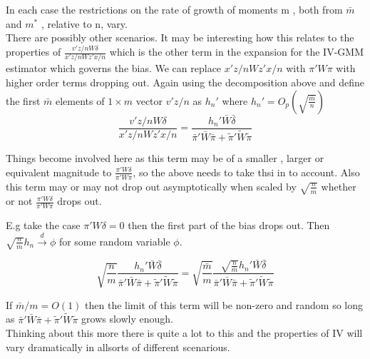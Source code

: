 \documentclass[11pt, fleqn]{article}
\begin{document}
In each case the restrictions on the rate of growth of moments m , both from $\bar{m}$ and $m^*$ , relative to n, vary.\\


There are possibly other  scenarios. It may be interesting how this relates to the properties of $\frac{v'z/nW\delta}{x'z/nWz'x/n}$ which is the other term in the expansion for the IV-GMM estimator which governs the bias. We can replace $x'z/nWz'x/n$ with $\pi'W\pi$ with higher order terms dropping out. Again using the decomposition above  and define the first $\bar{m}$ elements of $1 \times m$ vector $v'z/n$  as $h_n'$ where $h_n'=O_p(\sqrt{\frac{\bar{m}}{n}})$
\begin{equation} \frac{v'z/nW\delta}{x'z/nWz'x/n}=\frac{h_n'\bar{W}\bar{\delta}}{ \bar{\pi}'\bar{W}\bar{\pi}+\tilde{\pi}'\tilde{W}\tilde{\pi}}\end{equation}

Things become involved here as this term may be of a smaller , larger or equivalent magnitude to $\frac{\pi'W\delta}{\pi'W\pi}$, so the above needs to take thsi in to account. Also this term may or may not drop out asymptotically when scaled by $\sqrt{\frac{n}{m}}$ whether or not $\frac{\pi'W\delta}{\pi'W\pi}$ drops out.

E.g take the case $\pi'W\delta=0$ then the first part of the bias drops out. Then $\sqrt{\frac{n}{\bar{m}}}h_n\overset{d}{\rightarrow} \phi$ for some random variable $\phi$.

\begin{equation}  \sqrt{\frac{n}{m}}\frac{h_n'\bar{W}\bar{\delta}}{ \bar{\pi}'\bar{W}\bar{\pi}+\tilde{\pi}'\tilde{W}\tilde{\pi}}=\sqrt{\frac{\bar{m}}{m}}\frac{\sqrt{\frac{n}{\bar{m}}}h_n'\bar{W}\bar{\delta}}{ \bar{\pi}'\bar{W}\bar{\pi}+\tilde{\pi}'\tilde{W}\tilde{\pi}} \end{equation}

If $\bar{m}/m=O(1)$ then the limit of this term will be non-zero and random so long as $\bar{\pi}'\bar{W}\bar{\pi}+\tilde{\pi}'\tilde{W}\tilde{\pi}$ grows slowly enough.\\

Thinking about this more there is quite a lot to this and the properties of IV will vary dramatically in allsorts of different scenarious.
\end{document}
